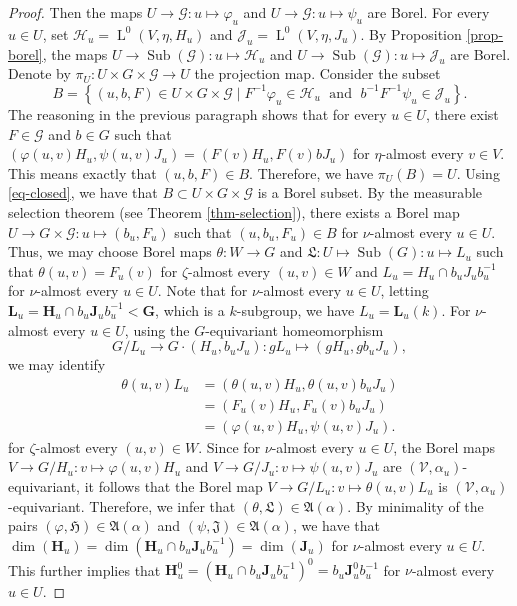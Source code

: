 \documentclass[11pt]{amsart}
\numberwithin{equation}{section}
\theoremstyle{plain}
\theoremstyle{definition}
\newcommand{\Sub}{\operatorname{Sub}}
\newcommand{\rL}{\operatorname{L}}
\begin{document}
\begin{proof}
 Then the maps $U \to \mathscr G : u \mapsto \varphi_u$ and $U \to \mathscr G : u \mapsto \psi_u$ are Borel.  For every $u \in U$, set $\mathscr H_u = \rL^0(V, \eta, H_u)$ and $\mathscr J_u = \rL^0(V, \eta, J_u)$. By Proposition \ref{prop-borel}, the maps $U \to \Sub(\mathscr G) : u \mapsto \mathscr H_u$ and $U \to \Sub(\mathscr G) : u \mapsto \mathscr J_u$ are Borel. Denote by $\pi_U : U \times G \times \mathscr G \to U$ the projection map. Consider the subset
$$B = \left\{ (u, b, F) \in U \times G \times \mathscr G \mid F^{-1}\varphi_u \in \mathscr H_u \; \text{ and } \;  b^{-1}F^{-1}\psi_u \in \mathscr J_u \right\}.$$ 
The reasoning in the previous paragraph shows that for every $u \in U$, there exist $F \in \mathscr G$ and $b \in G$ such that $(\varphi(u, v)H_u, \psi(u, v)J_u) = (F(v)H_u, F(v)b J_u)$ for $\eta$-almost every $v \in V$. This means exactly that $(u, b, F) \in B$. Therefore, we have $\pi_U(B) = U$. Using \eqref{eq-closed}, we have that $B \subset U \times G \times \mathscr G$ is a Borel subset. By the measurable selection theorem (see Theorem \ref{thm-selection}), there exists a Borel map $U \to G \times \mathscr G : u \mapsto (b_u, F_u)$ such that $(u, b_u, F_u) \in B$ for $\nu$-almost every $u \in U$. Thus, we may choose Borel maps $\theta : W \to G$ and $\mathfrak L : U \mapsto \Sub(G) : u \mapsto L_u$ such that $\theta(u, v) = F_u(v)$ for $\zeta$-almost every $(u, v) \in W$ and $L_u = H_u \cap b_u J_u b_u^{-1}$ for $\nu$-almost every $u \in U$. Note that for $\nu$-almost every $u \in U$, letting $\mathbf L_u = \mathbf H_u \cap b_u \mathbf J_u b_u^{-1} < \mathbf G$, which is a $k$-subgroup, we have $L_u = \mathbf L_u(k)$. For $\nu$-almost every $u \in U$, using the $G$-equivariant homeomorphism 
$$G/L_u \to G \cdot (H_u, b_u J_u) : g L_u \mapsto (gH_u, g b_u J_u),$$ we may identify 
\begin{align*}
\theta(u, v)L_u &= (\theta(u, v)H_u, \theta(u, v) b_u J_u) \\
&= (F_u(v) H_u, F_u(v) b_u J_u) \\
&= (\varphi(u, v)H_u, \psi(u, v)J_u).
\end{align*}
for $\zeta$-almost every $(u, v) \in W$. Since for $\nu$-almost every $u \in U$, the Borel maps $V \to G/H_u : v \mapsto \varphi(u, v)H_u$ and $V \to G/J_u : v \mapsto \psi(u, v)J_u$ are $(\mathscr V, \alpha_u)$-equivariant, it follows that the Borel map $V \to G/L_u : v \mapsto \theta(u, v)L_u$ is $(\mathscr V, \alpha_u)$-equivariant. Therefore, we infer that $(\theta, \mathfrak L) \in \mathfrak A(\alpha)$. By minimality of the pairs $(\varphi, \mathfrak H) \in \mathfrak A(\alpha)$ and $(\psi, \mathfrak J) \in \mathfrak A(\alpha)$, we have that $\dim(\mathbf H_u) = \dim(\mathbf H_u \cap b_u \mathbf J_u b_u^{-1}) = \dim(\mathbf J_u)$ for $\nu$-almost every $u \in U$. This further implies that $\mathbf H_u^0 = (\mathbf H_u \cap b_u \mathbf J_u b_u^{-1})^0 = b_u \mathbf J_u^0 b_u^{-1}$ for $\nu$-almost every $u \in U$.



\end{proof}
\end{document}
